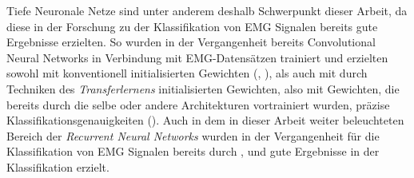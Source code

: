 Tiefe Neuronale Netze sind unter anderem deshalb Schwerpunkt dieser Arbeit, da diese in der Forschung zu der Klassifikation von EMG Signalen bereits gute Ergebnisse erzielten. So wurden in der Vergangenheit bereits Convolutional Neural Networks in Verbindung mit EMG-Datensätzen trainiert und erzielten sowohl mit konventionell initialisierten Gewichten (\cite{Allard2019}, \cite{geng2016gesture}), als auch mit durch Techniken des \textit{Transferlernens} initialisierten Gewichten, also mit Gewichten, die bereits durch die selbe oder andere Architekturen vortrainiert wurden, präzise Klassifikationsgenauigkeiten (\cite{cote2017transfer}). Auch in dem in dieser Arbeit weiter beleuchteten Bereich der \textit{Recurrent Neural Networks} wurden in der Vergangenheit für die Klassifikation von EMG Signalen bereits durch \cite{simao2019emg}, \cite{bu2003emg} und \cite{tsuji2000pattern} gute Ergebnisse in der Klassifikation erzielt.